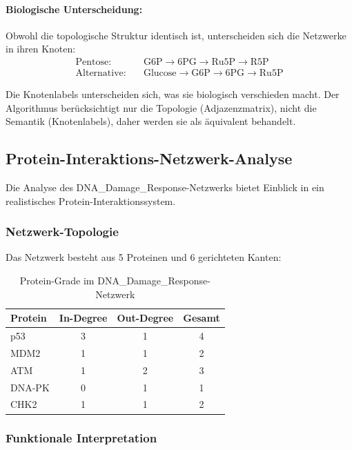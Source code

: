 ﻿\documentclass[a4paper,12pt]{article}
\theoremstyle{definition}
\begin{document}
\paragraph{Biologische Unterscheidung:}
Obwohl die topologische Struktur identisch ist, unterscheiden sich die Netzwerke in ihren Knoten:
\begin{align*}
	\text{Pentose}: &\quad \text{G6P} \rightarrow \text{6PG} \rightarrow \text{Ru5P} \rightarrow \text{R5P} \\
	\text{Alternative}: &\quad \text{Glucose} \rightarrow \text{G6P} \rightarrow \text{6PG} \rightarrow \text{Ru5P}
\end{align*}

Die Knotenlabels unterscheiden sich, was sie biologisch verschieden macht. Der Algorithmus berücksichtigt nur die Topologie (Adjazenzmatrix), nicht die Semantik (Knotenlabels), daher werden sie als äquivalent behandelt.

\subsection{Protein-Interaktions-Netzwerk-Analyse}

Die Analyse des DNA\_Damage\_Response-Netzwerks bietet Einblick in ein realistisches Protein-Interaktionssystem.

\subsubsection{Netzwerk-Topologie}

Das Netzwerk besteht aus 5 Proteinen und 6 gerichteten Kanten:

\begin{table}[h]
	\centering
	\caption{Protein-Grade im DNA\_Damage\_Response-Netzwerk}
	\label{tab:protein_degrees}
	\begin{tabular}{|l|c|c|c|}
		\hline
		\textbf{Protein} & \textbf{In-Degree} & \textbf{Out-Degree} & \textbf{Gesamt} \\
		\hline
		p53 & 3 & 1 & 4 \\
		MDM2 & 1 & 1 & 2 \\
		ATM & 1 & 2 & 3 \\
		DNA-PK & 0 & 1 & 1 \\
		CHK2 & 1 & 1 & 2 \\
		\hline
	\end{tabular}
\end{table}

\subsubsection{Funktionale Interpretation}
\end{document}
